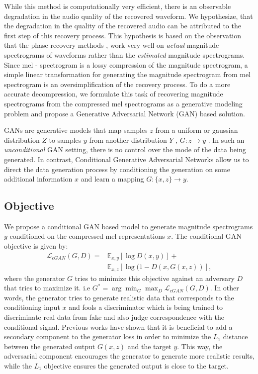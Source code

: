 \documentclass[a4paper]{article}
\begin{document}
While this method is computationally very efficient, there is an observable degradation in the audio quality of the recovered waveform. We hypothesize, that the degradation in the quality of the recovered audio can be attributed to the first step of this recovery process. This hypothesis is based on the observation that the phase recovery methods \cite{griffinlim,lws}, work very well on \textit{actual} magnitude spectrograms of waveforms rather than the \textit{estimated} magnitude spectrograms. 
Since mel - spectrogram is a lossy compression of the magnitude spectrogram, a simple linear transformation for generating the magnitude spectrogram from mel spectrogram is an oversimplification of the recovery process. To do a more accurate decompression, we formulate this task of recovering magnitude spectrograms from the compressed mel spectrograms as a generative modeling problem and propose a Generative Adversarial Network (GAN)\cite{goodfellow2014generative} based solution.

GANs are generative models that map samples $z$ from a uniform or gaussian distribution $Z$ to samples $y$ from another distribution $Y$ , $G: z\rightarrow y$ \cite{goodfellow2014generative}. In such an \textit{unconditional} GAN setting, there is no control over the mode of the data being generated. In contrast, Conditional Generative Adversarial Networks \cite{cGAN} allow us to direct the data generation process by conditioning the generation on some additional information $x$ and learn a mapping $G: \{x,z\}\rightarrow y$.

\subsection{Objective}
We propose a conditional GAN based model to generate magnitude spectrograms $y$ conditioned on the compressed mel representations $x$. The conditional GAN objective is given by:
\begin{align}
    \mathcal{L}_{cGAN}(G,D) = &\mathbb{E}_{x,y}[\log D(x,y)] + \nonumber \\
                 &\mathbb{E}_{x,z}[\log (1-D(x,G(x,z))],\label{cGAN_equation}
\end{align}
where the generator $G$ tries to minimize this objective against an adversary $D$ that tries to maximize it. i.e $G^*  = \arg\min_G \max_D \mathcal{L}_{cGAN}(G,D)$. In other words, the generator tries to generate realistic data that corresponds to the conditioning input $x$ and fools a discriminator which is being trained to discriminate real data from fake and also judge correspondence with the conditional signal. Previous works have shown that it is beneficial to add a secondary component to the generator loss in order to minimize the $L_1$ distance between the generated output $G(x,z)$ and the target $y$. This way, the adversarial component encourages the generator to generate more realistic results,  while the $L_1$ objective ensures the generated output is close to the target.
\end{document}
